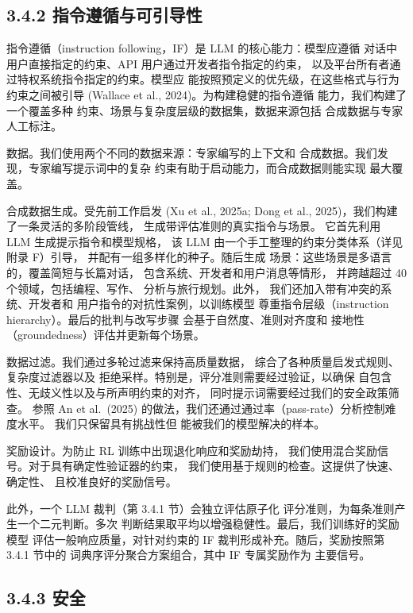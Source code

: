 \subsection{3.4.2 指令遵循与可引导性}\label{instruction-following-and-steerability}

指令遵循（instruction following，IF）是 LLM 的核心能力：模型应遵循
对话中用户直接指定的约束、API 用户通过开发者指令指定的约束，
以及平台所有者通过特权系统指令指定的约束。模型应
能按照预定义的优先级，在这些格式与行为
约束之间被引导 (Wallace et al., 2024)。为构建稳健的指令遵循
能力，我们构建了一个覆盖多种
约束、场景与复杂度层级的数据集，数据来源包括
合成数据与专家人工标注。

数据。我们使用两个不同的数据来源：专家编写的上下文和
合成数据。我们发现，专家编写提示词中的复杂
约束有助于启动能力，而合成数据则能实现
最大覆盖。

合成数据生成。受先前工作启发 (Xu et al., 2025a;
Dong et al., 2025)，我们构建了一条灵活的多阶段管线，
生成带评估准则的真实指令与场景。
它首先利用 LLM 生成提示指令和模型规格，
该 LLM 由一个手工整理的约束分类体系（详见附录 F）引导，
并配有一组多样化的种子。随后生成
场景：这些场景是多语言的，覆盖简短与长篇对话，
包含系统、开发者和用户消息等情形，
并跨越超过 40 个领域，包括编程、写作、
分析与旅行规划。此外，
我们还加入带有冲突的系统、开发者和
用户指令的对抗性案例，以训练模型
尊重指令层级（instruction hierarchy）。最后的批判与改写步骤
会基于自然度、准则对齐度和
接地性（groundedness）评估并更新每个场景。

数据过滤。我们通过多轮过滤来保持高质量数据，
综合了各种质量启发式规则、复杂度过滤器以及
拒绝采样。特别是，评分准则需要经过验证，以确保
自包含性、无歧义性以及与所声明约束的对齐，
同时提示词需要经过我们的安全政策筛查。
参照 An et al.~(2025) 的做法，我们还通过通过率（pass-rate）分析控制难度水平。
我们只保留具有挑战性但
能被我们的模型解决的样本。

奖励设计。为防止 RL 训练中出现退化响应和奖励劫持，
我们使用混合奖励信号。对于具有确定性验证器的约束，
我们使用基于规则的检查。这提供了快速、确定性、
且校准良好的奖励信号。

此外，一个 LLM 裁判（第 3.4.1 节）会独立评估原子化
评分准则，为每条准则产生一个二元判断。多次
判断结果取平均以增强稳健性。最后，我们训练好的奖励模型
评估一般响应质量，对针对约束的
IF 裁判形成补充。随后，奖励按照第 3.4.1 节中的
词典序评分聚合方案组合，其中 IF 专属奖励作为
主要信号。

\subsection{3.4.3 安全}\label{safety}

